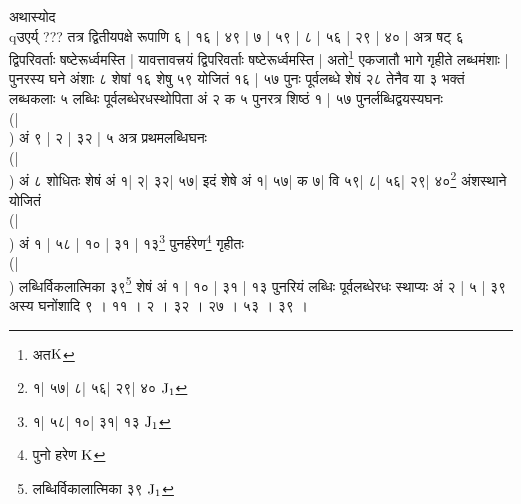 \documentclass[11pt,a5paper]{book}
\begin{document}
\newpage 
{\s अथास्योद \\qउएर्य् ??? 
तत्र द्वितीयपक्षे रूपाणि ६ | १६ | ४९ | ७ | ५९ | ८ | ५६ | २९ | ४० | 
अत्र षट् ६ द्विपरिवर्ताः षष्टेरूर्ध्वमस्ति | 
यावत्तावत्त्रयं द्विपरिवर्ताः षष्टेरूर्ध्वमस्ति | 
अतो\footnote{{\s अत}${\rm K}$} एकजातौ 
भागे गृहीते लब्धमंशाः | 
पुनरस्य घने अंशाः ८ शेषां १६ शेषु ५९ योजितं
१६ | ५७  पुनः पूर्वलब्धे शेषं २८ तेनैव या ३
भक्तं लब्धकलाः ५ लब्धिः पूर्वलब्धेरधस्थोपिता अं २
क ५ पुनरत्र शिष्ठं १ | ५७ पुनर्लब्धिद्वयस्यघनः\\(|\\)
अं ९ | २ | ३२ | ५ अत्र प्रथमलब्धिघनः\\(|\\)
अं ८ शोधितः शेषं अं १| २| ३२| ५७|
इदं शेषे अं १| ५७| क ७| वि ५९| ८| ५६| २९| ४०\footnote{{\s १| ५७| %
८| ५६| २९| ४० } ${\rm J_1}$}
अंशस्थाने योजितं \\(|\\) अं १ | ५८ | १० | ३१ | १३\footnote{{\s १| ५८| %
 १०| ३१| १३} ${\rm J_1}$}
पुनर्हरेण\footnote{{\s पुनो हरेण} ${\rm K}$}
गृहीतः \\(|\\)
लब्धिर्विकलात्मिका ३९\footnote{{\s लब्धिर्विकालात्मिका ३९ } ${\rm J_1}$}
शेषं अं १ | १० | ३१ | १३ पुनरियं लब्धिः पूर्वलब्धेरधः स्थाप्यः
अं २ | ५ | ३९
अस्य घनोंशादि ९ । ११ । २ । ३२ । २७ । ५३ । ३९ ।}


\newpage 
\end{document}
